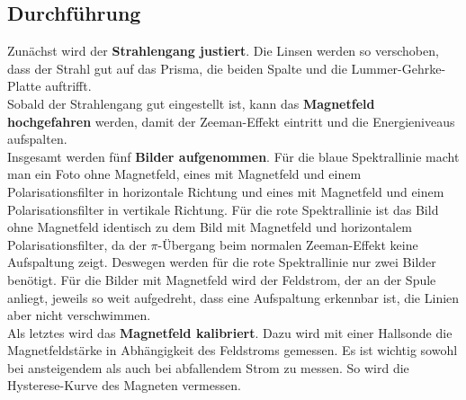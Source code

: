 \subsection{Durchführung}
Zunächst wird der \textbf{Strahlengang justiert}. Die Linsen werden so verschoben, dass der Strahl gut auf das Prisma, die beiden Spalte und die Lummer-Gehrke-Platte auftrifft. \\
Sobald der Strahlengang gut eingestellt ist, kann das \textbf{Magnetfeld hochgefahren} werden, damit der Zeeman-Effekt eintritt und die Energieniveaus aufspalten. \\
Insgesamt werden fünf \textbf{Bilder aufgenommen}. Für die blaue Spektrallinie macht man ein Foto ohne Magnetfeld, eines mit Magnetfeld und einem Polarisationsfilter in horizontale Richtung und eines mit Magnetfeld und einem Polarisationsfilter in vertikale Richtung. Für die rote Spektrallinie ist das Bild ohne Magnetfeld identisch zu dem Bild mit Magnetfeld und horizontalem Polarisationsfilter, da der $\pi$-Übergang beim normalen Zeeman-Effekt keine Aufspaltung zeigt. Deswegen werden für die rote Spektrallinie nur zwei Bilder benötigt. Für die Bilder mit Magnetfeld wird der Feldstrom, der an der Spule anliegt, jeweils so weit aufgedreht, dass eine Aufspaltung erkennbar ist, die Linien aber nicht verschwimmen. \\
Als letztes wird das \textbf{Magnetfeld kalibriert}. Dazu wird mit einer Hallsonde die Magnetfeldstärke in Abhängigkeit des Feldstroms gemessen. Es ist wichtig sowohl bei ansteigendem als auch bei abfallendem Strom zu messen. So wird die Hysterese-Kurve des Magneten vermessen.